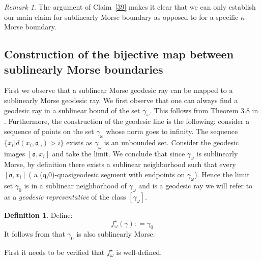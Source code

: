 \documentclass[12 pt]{amsart}
\newcommand{\gothic}{\mathfrak}
\newcommand{\go}{{\gothic o}}
\theoremstyle{definition}
\newtheorem{definition}[theorem]{Definition}
\theoremstyle{remark}
\newtheorem{remark}[theorem]{Remark}
\begin{document}
\begin{remark}
The argument of Claim~\ref{39} makes it clear that we can only establish our main claim for sublinearly Morse boundary as opposed to for a specific $\kappa$-Morse boundary. 
\end{remark}
\subsection{Construction of the bijective map between sublinearly Morse boundaries} \label{Remark1}

First we observe that  a sublinear Morse geodesic ray can be mapped to a sublinearly Morse geodesic ray.
We first observe that one can always find a geodesic ray in a sublinear bound of the  set $\gamma_\omega$. This follows from Theorem 3.8 in \cite{JanaQing1}. 
Furthermore, the construction of the geodesic line is the following: consider a sequence of points on the set
$\gamma_\omega$ whose norm goes to infinity. The sequence $\{ x_i | d(x_i, \go_\omega) > i\}$ exists as $\gamma_\omega$ is an unbounded set. Consider the geodesic images $[\go, x_i]$ and take the limit. We conclude that since $\gamma_\omega$ is sublinearly Morse, by definition there exists a sublinear neighborhood such that every $[\go, x_i]$ ( a (q,0)-quasigeodesic segment with endpoints on $\gamma_\omega$). Hence the limit set $\gamma_0$ is in a sublinear neighborhood of $\gamma_\omega$ and is a geodesic ray we will refer to as a \emph{geodesic representative} of the class $[\gamma_\omega]$. 
\begin{definition}\label{maponray}
Define:
\[f^\star_\omega (\gamma) : = \gamma_0\]
It follows from \cite[Lemma 4.2]{QRT2} that $\gamma_0$ is also sublinearly Morse.
\end{definition}
First it needs to be verified that $f^\star_\omega$ is well-defined. 
\end{document}
